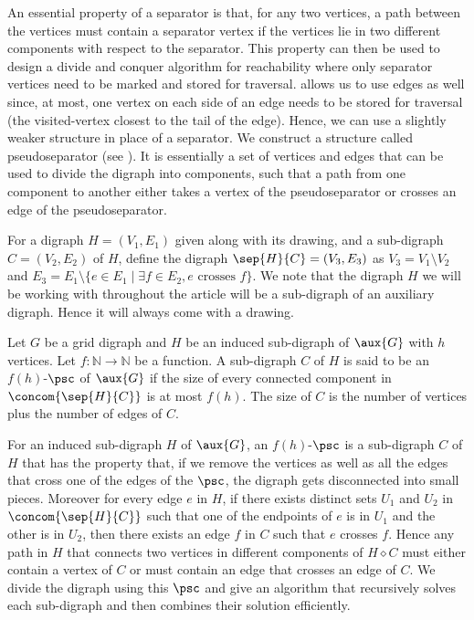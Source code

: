 \documentclass{toc}
\begin{document}
An essential property of a separator is that, for any two vertices, a path between the vertices must contain a separator vertex if the vertices lie in two different components with respect to the separator. This property can then be used to design a divide and conquer %
algorithm for reachability where only separator vertices need to be marked and stored for traversal.  allows us to use edges as well since, at most, one vertex on each side of an edge needs to be stored for traversal (the visited-vertex closest to the tail of the edge). Hence, we can use a slightly weaker structure in place of a separator. We construct a structure called pseudoseparator (see ). It is essentially a set of vertices and edges that can be used to divide the %
digraph %
into components, such that a path from one component to another either takes a vertex of the pseudoseparator or crosses an edge of the pseudoseparator.

For a %
digraph %
$H = (V_1, E_1)$ given along with its drawing,
%
%
%
%
%
and a  %
sub-digraph %
$C = (V_2, E_2)$ of $H$, define the 
digraph %
$\sep{H}{C} = (V_3, E_3)$ as $V_3 = V_1 \setminus V_2$ and $E_3 = E_1 \setminus \{e \in E_1 \mid \exists f \in E_2, e \textrm{ crosses } f\}$. We note that the %
digraph %
$H$ we will be working with throughout the article will be a  %
sub-digraph %
 of an auxiliary %
digraph. %
Hence it will always come with a drawing.

\begin{definition}
\label{def:psc}
Let $G$ be a grid %
digraph %
and $H$ be
%
%
an induced  %
sub-digraph %
 of $\aux{G}$ with $h$ vertices. Let $f:\mathbb{N} \rightarrow \mathbb{N}$ be a function. A  %
sub-digraph %
 $C$ of $H$ is said to be an $f(h)$-$\psc$ of $\aux{G}$ if the size of every connected component in $\concom{\sep{H}{C}}$ is at most $f(h)$. The size of $C$ is the
%
%
%
number of vertices plus the number of edges of $C$.
\end{definition}

For
%
an induced%
sub-digraph %
 $H$ of $\aux{G}$, an $f(h)$-$\psc$ is a  %
sub-digraph %
 $C$ of $H$ that has the property that, if we remove the vertices as well as all the edges that cross one of the edges of the $\psc$, the %
digraph %
 gets disconnected into small pieces. Moreover for every edge $e$ in $H$, if there exists distinct sets $U_1$ and $U_2$ in $\concom{\sep{H}{C}}$ such that one of the endpoints of $e$ is in $U_1$ and the other is in $U_2$, then there exists an edge $f$ in $C$ such that $e$ crosses $f$. Hence any path in $H$ that connects two vertices in different components of $H \diamond C$ must either contain a vertex of $C$ or must contain an edge that crosses an edge of $C$. We divide the %
digraph %
 using this $\psc$ and give an algorithm that recursively solves each  %
sub-digraph %
 and then combines their solution efficiently.
\end{document}
